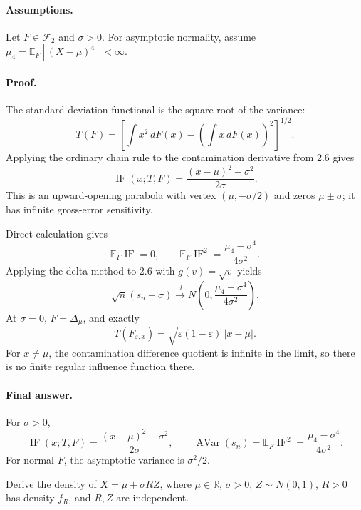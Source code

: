 \documentclass[answers,12pt,addpoints]{exam}
\providecommand{\E}{\mathbb{E}}
\providecommand{\R}{\mathbb{R}}
\providecommand{\IF}{\operatorname{IF}}
\begin{document}
\begin{questions}
\begin{solution}
\paragraph{Assumptions.}
Let $F\in\mathcal F_2$ and $\sigma>0$. For asymptotic normality,
assume $\mu_4=\E_F[(X-\mu)^4]<\infty$.

\paragraph{Proof.}
The standard deviation functional is the square root of the variance:
\[
T(F)=\left[\int x^2\,dF(x)-\left(\int x\,dF(x)\right)^2\right]^{1/2}.
\]
Applying the ordinary chain rule to the contamination derivative
from 2.6 gives
\[
\IF(x;T,F)=\frac{(x-\mu)^2-\sigma^2}{2\sigma}.
\]
This is an upward-opening parabola with vertex $(\mu,-\sigma/2)$
and zeros $\mu\pm\sigma$; it has infinite gross-error sensitivity.
\begin{center}
\end{center}
Direct calculation gives
\[
\E_F\IF=0,\qquad
\E_F\IF^2=\frac{\mu_4-\sigma^4}{4\sigma^2}.
\]
Applying the delta method to 2.6 with $g(v)=\sqrt v$ yields
\[
\sqrt n(s_n-\sigma)\xrightarrow{d}
N\left(0,\frac{\mu_4-\sigma^4}{4\sigma^2}\right).
\]
At $\sigma=0$, $F=\Delta_\mu$, and exactly
\[
T(F_{\varepsilon,x})=\sqrt{\varepsilon(1-\varepsilon)}\,|x-\mu|.
\]
For $x\ne\mu$, the contamination difference quotient is infinite
in the limit, so there is no finite regular influence function there.

\paragraph{Final answer.}
For $\sigma>0$,
\[
\boxed{\IF(x;T,F)=\frac{(x-\mu)^2-\sigma^2}{2\sigma},\qquad
\operatorname{AVar}(s_n)=\E_F\IF^2
=\frac{\mu_4-\sigma^4}{4\sigma^2}.}
\]
For normal $F$, the asymptotic variance is $\sigma^2/2$.
\end{solution}

\question
Derive the density of $X=\mu+\sigma RZ$, where $\mu\in\R$,
$\sigma>0$, $Z\sim N(0,1)$, $R>0$ has density $f_R$, and $R,Z$
are independent.


\end{questions}
\end{document}
